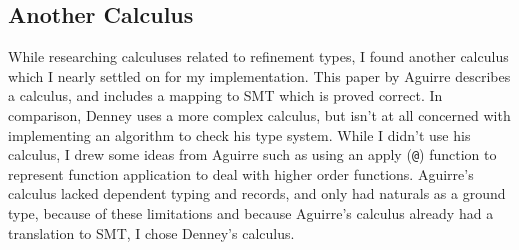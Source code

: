 \subsection{Another Calculus}

While researching calculuses related to refinement types, I found another calculus which I nearly
settled on for my implementation.
This paper by Aguirre \cite{aguirre16} describes a calculus, and includes a mapping to SMT which
is proved correct.
In comparison, Denney uses a more complex calculus, but isn't at all concerned with implementing
an algorithm to check his type system.
While I didn't use his calculus, I drew some ideas from Aguirre such as using an apply (\texttt{@})
function to represent function application to deal with higher order functions.
Aguirre's calculus lacked dependent typing and records, and only had naturals as a ground type,
because of these limitations and because Aguirre's calculus already had a translation to SMT, I
chose Denney's calculus.
